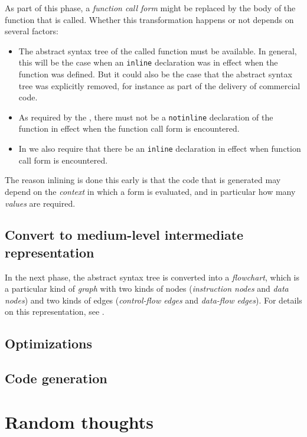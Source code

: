 As part of this phase, a \emph{function call form} might be replaced
by the body of the function that is called.  Whether this
transformation happens or not depends on several factors:

\begin{itemize}
\item The abstract syntax tree of the called function must be
  available.  In general, this will be the case when an
  \texttt{inline} declaration was in effect when the function was
  defined.  But it could also be the case that the abstract syntax
  tree was explicitly removed, for instance as part of the delivery of
  commercial code. 
\item As required by the \hs{}, there must not be a \texttt{notinline}
  declaration of the function in effect when the function call form is
  encountered.
\item In \sysname{} we also require that there be an \texttt{inline}
  declaration in effect when function call form is encountered.
\end{itemize}

The reason inlining is done this early is that the code that is
generated may depend on the \emph{context} in which a form is
evaluated, and in particular how many \emph{values} are required.  

\subsection{Convert to medium-level intermediate representation}

In the next phase, the abstract syntax tree is converted into a
\emph{flowchart}, which is a particular kind of \emph{graph} with two
kinds of nodes (\emph{instruction nodes} and \emph{data nodes}) and
two kinds of edges (\emph{control-flow edges} and \emph{data-flow
  edges}).  For details on this representation, see
.

\subsection{Optimizations}

\subsection{Code generation} 

\section{Random thoughts}


